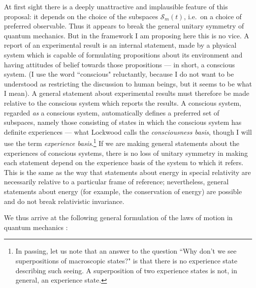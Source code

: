 \documentclass[12pt,a4paper,reqno]{article}
\renewcommand{\(}{\left(}
\renewcommand{\)}{\right)}
\renewcommand{\S}{\mathcal{S}}
\newcommand{\<}{\langle}
\renewcommand{\>}{\rangle}
\theoremstyle{plain} %
\theoremstyle{definition}
\theoremstyle{remark}
\begin{document}
At first sight there is a deeply unattractive and implausible feature of
this proposal: it depends on the choice of the subspaces $\S_m(t)$,
i.e.\ on a choice of preferred observable. Thus it appears to break the general unitary
symmetry of quantum mechanics. But in the framework I am proposing here
this is no vice. A report of an experimental result is an internal statement, made by a
physical system which is capable of formulating
propositions about its environment and having attitudes of belief
towards those propositions --- in short, a conscious system.
(I use the word ``conscious" reluctantly, 
because I do not want to be understood as restricting the discussion to
human beings, but it seems to be what I mean). A general statement about
experimental results must therefore be made relative to the conscious
system which reports the results. A conscious system,
regarded \emph{as} a conscious system, automatically defines a preferred set of
subspaces, namely those consisting of states in which the conscious
system has definite experiences  --- what Lockwood \cite{Lockwood:manyminds}
calls the \emph{consciousness basis}, though I will use the term
\emph{experience basis}.\footnote{In passing, let us note that an answer to the
question ``Why don't we see superpositions of macroscopic states?" is
that there is no experience state describing such seeing. A
superposition of two experience states is not, in general, an experience
state.} If we are making general statements about the
experiences of conscious systems, there is no loss of unitary symmetry
in making each statement depend on the experience basis of the system to
which it refers. This is the same as the way that statements about
energy in special relativity are necessarily relative to a particular
frame of reference; nevertheless, general statements about energy (for
example, the conservation of energy) are possible and do not break
relativistic invariance. 

We thus arrive at the following general formulation of the laws of
motion in quantum mechanics%
:
\end{document}
